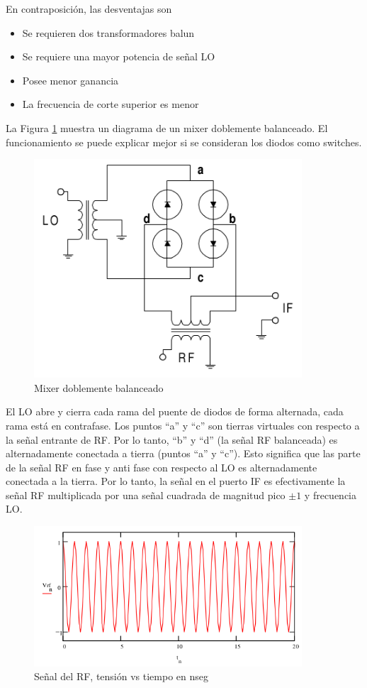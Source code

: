 \documentclass[a4paper,10pt]{article}
\begin{document}
	\indent En contraposición, las desventajas son

	\begin{itemize}
		\item Se requieren dos transformadores balun
		\item Se requiere una mayor potencia de señal LO
		\item Posee menor ganancia
		\item La frecuencia de corte superior es menor
	\end{itemize}

	\indent La Figura \ref{img:004} muestra un diagrama de un mixer doblemente 
	balanceado. El funcionamiento se puede explicar mejor si se consideran los 
	diodos como switches. \\
	
	\begin{figure}[!htb]
		\centering
		\includegraphics[width=10cm]{Images/DoubleBalancedMixer.png}
		\caption{Mixer doblemente balanceado}
		\label{img:004}
	\end{figure}

	
	\indent El LO abre y cierra cada rama del puente de diodos de
	forma alternada, cada rama está en contrafase. Los puntos ``a'' y ``c'' son 
	tierras virtuales con respecto a la señal entrante de RF. Por lo tanto, ``b'' 
	y ``d'' (la señal RF balanceada) es alternadamente conectada a tierra (puntos 
	``a'' y ``c''). Esto significa que las parte de la señal RF en fase y anti fase 
	con respecto al LO es alternadamente conectada a la tierra. Por lo tanto, la
	señal en el puerto IF es efectivamente la señal RF multiplicada por una 
	señal cuadrada de magnitud pico $\pm 1$ y frecuencia LO. \\
	
	\begin{figure}[!htb]
		\centering
		\includegraphics[width=10cm]{Images/VRF.png}
		\caption{Señal del RF, tensión vs tiempo en nseg}
		\label{img:005}
	\end{figure}
\end{document}
